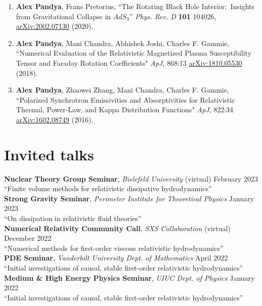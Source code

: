 \documentclass[margin,line,11pt]{resume}
\edef\hc{\string:} %
\begin{document}
\begin{resume}
\begin{enumerate}
\item \textbf{Alex Pandya}, Frans Pretorius, ``The Rotating Black Hole Interior\hc\, Insights from Gravitational Collapse in $AdS_3$'' \textit{Phys. Rev. D} \textbf{101} 104026, \href{https://arxiv.org/abs/2002.07130}{arXiv\hc2002.07130} (2020).
\vspace{1mm}

\item \textbf{Alex Pandya}, Mani Chandra, Abhishek Joshi, Charles F. Gammie, ``Numerical Evaluation of the Relativistic Magnetized Plasma Susceptibility Tensor and Faraday Rotation Coefficients" \textit{ApJ}, 868\hc13 \href{https://arxiv.org/abs/1810.05530}{arXiv\hc1810.05530} (2018).
\vspace{1mm}

\item \textbf{Alex Pandya}, Zhaowei Zhang, Mani Chandra, Charles F. Gammie, ``Polarized Synchrotron Emissivities and Absorptivities for Relativistic Thermal, Power-Law, and Kappa Distribution Functions" \textit{ApJ}, 822\hc34 \href{https://arxiv.org/abs/1602.08749}{arXiv\hc1602.08749} (2016).
\end{enumerate}

\vspace{2mm}
\section{\mysidestyle Invited talks}

\textbf{Nuclear Theory Group Seminar}, \textit{Bielefeld University} (virtual) \hfill February 2023 \\
``Finite volume methods for relativistic dissipative hydrodynamics'' \vspace{2mm} \\
\textbf{Strong Gravity Seminar}, \textit{Perimeter Institute for Theoretical Physics} \hfill January 2023 \\
``On dissipation in relativistic fluid theories'' \vspace{2mm} \\
\textbf{Numerical Relativity Community Call}, \textit{SXS Collaboration} (virtual) \hfill December 2022 \\
``Numerical methods for first-order viscous relativistic hydrodynamics'' \vspace{2mm} \\
\clearpage
\textbf{PDE Seminar}, \textit{Vanderbilt University Dept. of Mathematics} \hfill April 2022 \\
``Initial investigations of causal, stable first-order relativistic hydrodynamics'' \vspace{2mm} \\
\textbf{Medium \& High Energy Physics Seminar}, \textit{UIUC Dept. of Physics} \hfill January 2022 \\
``Initial investigations of causal, stable first-order relativistic hydrodynamics'' \\


\end{resume}
\end{document}

